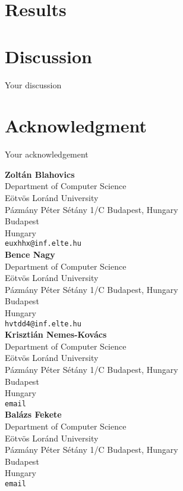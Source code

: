 \documentclass[10pt,leqno,twoside]{article}
\begin{document}
\section{Results}




\section{Discussion} %
Your discussion

\section*{Acknowledgment}
Your acknowledgement

\printbibliography[title=References]


\clearpage
\vspace{2cm}

\noindent\textbf{Zoltán Blahovics}\\
Department of Computer Science\\Eötvös Loránd University\\Pázmány Péter Sétány 1/C Budapest, Hungary\\
Budapest\\
Hungary\\
{\tt euxhhx@inf.elte.hu}\\

\noindent\textbf{Bence Nagy}\\
Department of Computer Science\\Eötvös Loránd University\\Pázmány Péter Sétány 1/C Budapest, Hungary\\
Budapest\\
Hungary\\
{\tt hvtdd4@inf.elte.hu}\\

\noindent\textbf{Krisztián Nemes-Kovács}\\
Department of Computer Science\\Eötvös Loránd University\\Pázmány Péter Sétány 1/C Budapest, Hungary\\
Budapest\\
Hungary\\
{\tt email}\\

\noindent\textbf{Balázs Fekete}\\
Department of Computer Science\\Eötvös Loránd University\\Pázmány Péter Sétány 1/C Budapest, Hungary\\
Budapest\\
Hungary\\
{\tt email}\\
\end{document}
